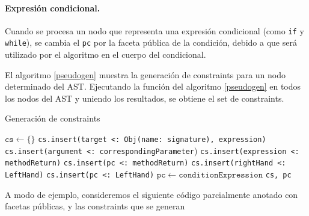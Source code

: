 \paragraph{Expresión condicional.}Cuando se procesa un nodo que representa una expresión condicional (como \texttt{if} y \texttt{while}), se cambia el \texttt{pc} por la faceta pública de la condición, debido a que será utilizado por el algoritmo en el cuerpo del condicional.

El algoritmo \ref{pseudogen} muestra la generación de constraints para un nodo determinado del AST. Ejecutando la función del algoritmo \ref{pseudogen} en todos los nodos del AST y uniendo los resultados, se obtiene el set de constraints.
\clearpage

\begin{algorithm}\captionsetup{labelsep=newline}
  \centering
  \caption{Generación de constraints}
  \label{pseudogen}
    \begin{algorithmic}[1]
          \State $\mathtt{cs\gets \{\}}$
              \State \texttt{cs.insert(target <: Obj(name: signature), expression)}
                \State \texttt{cs.insert(argument <: correspondingParameter})
              \EndFor
            \EndCase
              \State \texttt{cs.insert(expression <: methodReturn)}
              \State \texttt{cs.insert(pc <: methodReturn)}
            \EndCase
              \State \texttt{cs.insert(rightHand <: LeftHand)}
              \State \texttt{cs.insert(pc <: LeftHand)}
            \EndCase
              \State $\mathtt{pc\gets conditionExpression}$
            \EndCase
          \EndSwitch
          \State \Return \texttt{cs, pc}
      \EndFunction
    \end{algorithmic}
\end{algorithm}
A modo de ejemplo, consideremos el siguiente código parcialmente anotado con facetas públicas, y las constraints que se generan



